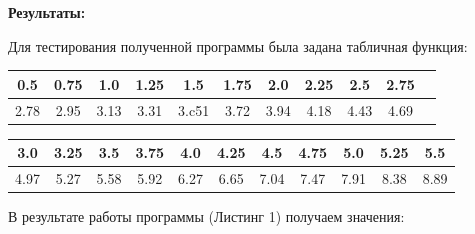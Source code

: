\documentclass [12pt]{article}
\begin{document}
\textbf{Результаты:}

Для тестирования полученной программы была задана табличная функция:

\begin{table}[h]
\begin{center}
\begin{tabular}{|c|c|c|c|c|c|c|c|c|c|c|}
\hline
0.5 & 0.75 & 1.0 & 1.25 & 1.5 & 1.75 & 2.0 & 2.25 & 2.5 & 2.75\\
\hline
2.78 & 2.95 & 3.13 & 3.31 & 3.c51 & 3.72 & 3.94 & 4.18 & 4.43 & 4.69\\
\hline
\end{tabular}
\end{center}
\end{table}

\begin{table}[h]
\begin{center}
\begin{tabular}{|c|c|c|c|c|c|c|c|c|c|c|}
\hline
3.0 & 3.25 & 3.5 & 3.75 & 4.0 & 4.25 & 4.5 & 4.75 & 5.0 & 5.25 & 5.5 \\
\hline
4.97 & 5.27 & 5.58 & 5.92 & 6.27 & 6.65 & 7.04 & 7.47 & 7.91 & 8.38 & 8.89 \\
\hline
\end{tabular}
\end{center}
\end{table}

В результате работы программы (Листинг 1) получаем значения:
\end{document}
